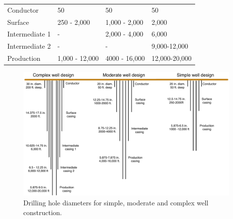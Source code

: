 \documentclass[11pt]{report}
\begin{document}
\begin{landscape}
\begin{table}
\begin{scriptsize}
\tabletail{}
\tablelasttail{\bottomrule}
\label{tab:drilling_length}
\begin{threeparttable}
\begin{supertabular*}{0.6\columnwidth}{p{0.12\columnwidth}p{0.12\columnwidth}p{0.12\columnwidth}p{0.12\columnwidth}}
Conductor 	& 50      			& 50      			& 50      		  	\\
Surface 		&250 - 2,000		& 1,000 - 2,000 		& 2,000 		  	\\
Intermediate 1 	& -  				& 2,000 - 4,000  		& 6,000       		\\
Intermediate 2 	& -  				& -  				& 9,000-12,000  	 \\
Production 	& 1,000 - 12,000 	& 4000 - 16,000  	& 12,000-20,000        \\
\end{supertabular*}
\end{threeparttable}
\end{scriptsize}
\end{table}

\end{landscape}


\begin{figure}[t]
\includegraphics[width=1\columnwidth]{images/all_well_hole_diam.pdf}
\caption{Drilling hole diameters for simple, moderate and complex well construction.}
\label{fig:hole_diam}
\end{figure}
\end{document}
